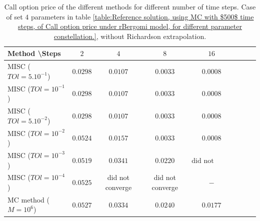 \documentclass[11pt]{article}
\begin{document}
\begin{table}[h!]
	\centering
	\begin{tabular}{l*{6}{c}r}
		Method \textbackslash  Steps            & $2$ & $4$ & $8$ & $16$ &   \\
		\hline
		MISC ($TOl=5.10^{-1}$)  & $0.0298$ & $0.0107$ & $0.0033$ & $0.0008$  \\
		MISC ($TOl=10^{-1}$)  & $0.0298$ & $0.0107$ & $0.0033$ & $0.0008$   \\
		MISC ($TOl=5.10^{-2}$)  &$0.0298$ & $0.0107$ & $0.0033$ & $0.0008$  \\
		MISC ($TOl=10^{-2}$)  & $0.0524$ & $0.0157$ & $0.0033$ & $0.0008$  \\
		MISC ($TOl=10^{-3}$)  & $0.0519$ & $0.0341$ & $0.0220$ & $\text{did not converge}$  \\
		MISC ($TOl=10^{-4}$)  & $0.0525$ & did not converge & did not converge &$-$ \\
		\hline
		MC method ($M=10^{6}$)   & $    0.0527$ & $0.0334$  & $ 0.0240$ & $  0.0177$ \\		
		
		\hline
	\end{tabular}
	\caption{ Call option price of the different methods for different number of time steps. Case of set $4$ parameters in table \ref{table:Reference solution, using MC with $500$ time steps, of Call option price under rBergomi model, for different parameter constellation.}, without Richardson extrapolation.}
	\label{table: Call option price of the different methods for different number of time steps. Case set 4}
\end{table}
\end{document}
